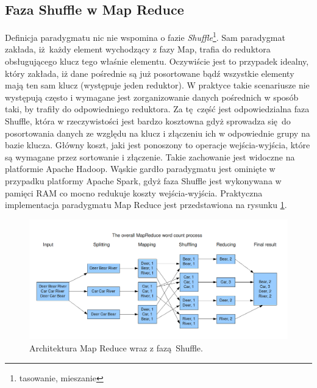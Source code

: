 \subsection{Faza Shuffle w Map Reduce}
Definicja paradygmatu nic nie wspomina o fazie \textit{Shuffle}\footnote{tasowanie, mieszanie}. Sam paradygmat zakłada, iż każdy element wychodzący z fazy Map, trafia do reduktora obsługującego klucz tego właśnie elementu. Oczywiście jest to przypadek idealny, który zakłada, iż dane pośrednie są już posortowane bądź wszystkie elementy mają ten sam klucz (występuje jeden reduktor). W praktyce takie scenariusze nie występują często i wymagane jest zorganizowanie danych pośrednich w sposób taki, by trafiły do odpowiedniego reduktora. Za tę część jest odpowiedzialna faza Shuffle, która w rzeczywistości jest bardzo kosztowna gdyż sprowadza się do posortowania danych ze względu na klucz i złączeniu ich w odpowiednie grupy na bazie klucza. Główny koszt, jaki jest ponoszony to operacje wejścia-wyjścia, które są wymagane przez sortowanie i złączenie. Takie zachowanie jest widoczne na platformie Apache Hadoop\cite{shuffle_description}. Wąskie gardło paradygmatu jest ominięte w przypadku platformy Apache Spark, gdyż faza Shuffle jest wykonywana w pamięci RAM co mocno redukuje koszty wejścia-wyjścia\cite{spark_in_memory}.
\newline
Praktyczna implementacja paradygmatu Map Reduce jest przedstawiona na rysunku \ref{fig:@=map_shuffle_reduce_schema}.
\begin{figure}
	\centering
	\includegraphics[scale=0.3]{MapReduceWordCount.png}
	\caption{Architektura Map Reduce wraz z fazą Shuffle\cite{map_shuffle_reduce_figure}.}
	\label{fig:@=map_shuffle_reduce_schema}
\end{figure}
